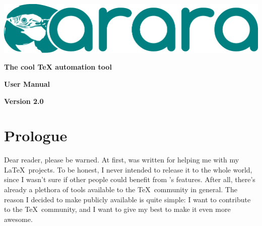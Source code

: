 \documentclass[a4paper,twoside,12pt]{memoir}
\newcommand{\araraversion}{2.0}
\begin{document}
\begin{titlingpage}

\begin{center}
\vspace*{3em}

\includegraphics[scale=.7]{figures/araralogo.pdf}

\vspace{2em}

{\color{araracolor}\bfseries\Huge The cool \TeX{} automation tool}

\vspace{15em}

\begin{mdframed}[innertopmargin=10pt,innerbottommargin=10pt,innerleftmargin=10pt,
                 innerrightmargin=10pt,roundcorner=5pt,linecolor=araracolor,
                 middlelinewidth=2pt]
{\color{araracolor}\bfseries\Huge\Forward\hfill User Manual}
\end{mdframed}

\vfill

{\color{araracolor}\bfseries\LARGE Version \araraversion}

\end{center}

\end{titlingpage}

\frontmatter
{}
\pagestyle{araraheadings}
\nouppercaseheads

\chapter*{Prologue}
\label{chap:prologue}

Dear reader, please be warned. At first, \arara was written for helping me with
my \LaTeX\ projects. To be honest, I never intended to release it to the whole 
world, since I wasn't sure if other people could benefit from \arara's features.
After all, there's already a plethora of tools available to the \TeX\ community
in general. The reason I decided to make \arara publicly available is quite 
simple: I want to contribute to the \TeX\ community, and I want to give my best
to make it even more awesome.
\end{document}
